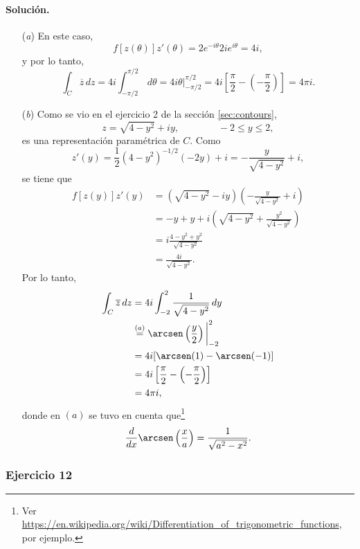 \documentclass[a4paper]{report}
\begin{document}
\paragraph{Solución.} 
\begin{enumerate}
 \item[(\textit{a})] En este caso,
 \[
  f[z(\theta)]z'(\theta)=2e^{-i\theta}2ie^{i\theta}=4i,
 \]
 y por lo tanto,
 \[
  \int_C\overline{z}\,dz=4i\int_{-\pi/2}^{\pi/2}\,d\theta=4i\theta\bigg|_{-\pi/2}^{\pi/2}
  =4i\left[\frac{\pi}{2}-\left(-\frac{\pi}{2}\right)\right]=4\pi i.
 \]
 \item[(\textit{b})] Como se vio en el ejercicio 2 de la sección \ref{sec:contours},
 \[
  z=\sqrt{4-y^2}+iy,
  \qquad\qquad-2\leq y\leq2,
 \]
 es una representación paramétrica de \(C\). Como
 \[
  z'(y)=\frac{1}{2}(4-y^2)^{-1/2}(-2y)+i=-\frac{y}{\sqrt{4-y^2}}+i,
 \]
 se tiene que 
 \begin{align*}
  f[z(y)]z'(y)&=\left(\sqrt{4-y^2}-iy\right)\left(-\frac{y}{\sqrt{4-y^2}}+i\right)\\
    &=-y+y+i\left(\sqrt{4-y^2}+\frac{y^2}{\sqrt{4-y^2}}\right)\\
    &=i\frac{4-y^2+y^2}{\sqrt{4-y^2}}\\
    &=\frac{4i}{\sqrt{4-y^2}}.
 \end{align*}
 Por lo tanto,
 \begin{align*}
  \int_C\overline{z}\,dz&=4i\int_{-2}^2\frac{1}{\sqrt{4-y^2}}\,dy\\
   &\overset{(a)}{=}\arcsen\left(\frac{y}{2}\right)\bigg|_{-2}^2\\
   &=4i[\arcsen(1)-\arcsen(-1)]\\
   &=4i\left[\frac{\pi}{2}-\left(-\frac{\pi}{2}\right)\right]\\
   &=4\pi i,
 \end{align*}
donde en \((a)\) se tuvo en cuenta que\footnote{Ver \url{https://en.wikipedia.org/wiki/Differentiation_of_trigonometric_functions}, por ejemplo.} 
\[
 \frac{d}{dx}\arcsen\left(\frac{x}{a}\right)=\frac{1}{\sqrt{a^2-x^2}}.
\]
\end{enumerate}

\subsubsection{Ejercicio 12}
\end{document}
